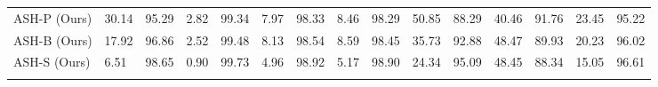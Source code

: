 \documentclass{article}
\newcommand{\tablabel}[1]{\label{tab:#1}}
\begin{document}
\begin{sidewaystable}
{\begin{tabular}{lllllllllllllll}
 \rowcolor{lightgray}ASH-P (Ours) & 30.14 & 95.29 & 2.82 & 99.34 & 7.97 & 98.33 & 8.46 & 98.29 & 50.85 & 88.29 & 40.46 & 91.76 & 23.45 & 95.22\\
\rowcolor{lightgray}ASH-B (Ours) & 17.92 & 96.86 & 2.52 & 99.48 & 8.13 & 98.54 & 8.59 & 98.45 & 35.73 & 92.88 & 48.47 & 89.93 & 20.23 & 96.02 \\
\rowcolor{lightgray}ASH-S (Ours) & 6.51 & 98.65 & 0.90 & 99.73 & 4.96 & 98.92 & 5.17 & 98.90 & 24.34 & 95.09 & 48.45 & 88.34 & 15.05 & 96.61 \\
\\ \bottomrule
\end{tabular}}
\tablabel{detailresultscifar10}
\end{sidewaystable}

\begin{sidewaystable}
\caption{\small Detailed results on six common OOD benchmark datasets: Textures~\citep{cimpoi2014describing}, SVHN~\citep{netzer2011reading}, Places365~\citep{zhou2017places}, LSUN-Crop~\citep{yu2015lsun}, LSUN-Resize~\citep{yu2015lsun}, and iSUN~\citep{xu2015turkergaze}. For each ID dataset, we use the same DenseNet pretrained on \textbf{CIFAR-100}. $\uparrow$ indicates larger values are better and $\downarrow$ indicates smaller values are better. }
\end{sidewaystable}
\end{document}
